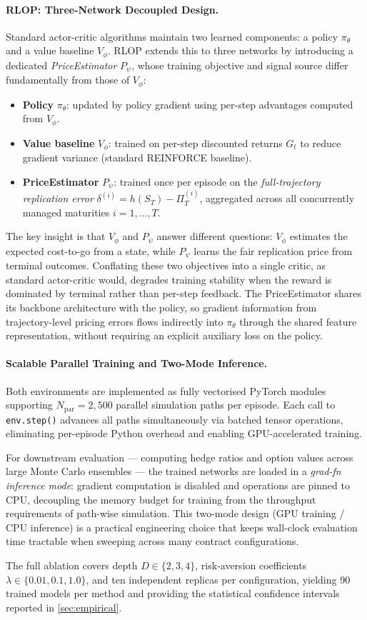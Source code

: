 \paragraph{RLOP: Three-Network Decoupled Design.}
Standard actor-critic algorithms maintain two learned components: a policy
$\pi_\theta$ and a value baseline $V_\phi$.
RLOP extends this to three networks by introducing a dedicated
\emph{PriceEstimator} $P_\psi$, whose training objective and signal
source differ fundamentally from those of $V_\phi$:
\begin{itemize}[leftmargin=1.2em,topsep=1pt,itemsep=0pt]
  \item \textbf{Policy} $\pi_\theta$: updated by policy gradient using
    per-step advantages computed from $V_\phi$.
  \item \textbf{Value baseline} $V_\phi$: trained on per-step discounted
    returns $G_t$ to reduce gradient variance (standard REINFORCE baseline).
  \item \textbf{PriceEstimator} $P_\psi$: trained once per episode on the
    \emph{full-trajectory replication error}
    $\delta^{(i)} = h(S_T) - \Pi_T^{(i)}$, aggregated across all
    concurrently managed maturities $i=1,\dots,T$.
\end{itemize}
The key insight is that $V_\phi$ and $P_\psi$ answer different questions:
$V_\phi$ estimates the expected cost-to-go from a state, while $P_\psi$
learns the fair replication price from terminal outcomes.
Conflating these two objectives into a single critic, as standard
actor-critic would, degrades training stability when the reward is dominated
by terminal rather than per-step feedback.
The PriceEstimator shares its backbone architecture with the policy,
so gradient information from trajectory-level pricing errors flows
indirectly into $\pi_\theta$ through the shared feature representation,
without requiring an explicit auxiliary loss on the policy.

\paragraph{Scalable Parallel Training and Two-Mode Inference.}
Both environments are implemented as fully vectorised PyTorch modules
supporting $N_{\mathrm{par}}=2{,}500$ parallel simulation paths per
episode.
Each call to \texttt{env.step()} advances all paths simultaneously via
batched tensor operations, eliminating per-episode Python overhead and
enabling GPU-accelerated training.

For downstream evaluation --- computing hedge ratios and option values
across large Monte Carlo ensembles --- the trained networks are loaded in a
\emph{grad-fn inference mode}: gradient computation is disabled and
operations are pinned to CPU, decoupling the memory budget for training from
the throughput requirements of path-wise simulation.
This two-mode design (GPU training / CPU inference) is a practical
engineering choice that keeps wall-clock evaluation time tractable when
sweeping across many contract configurations.

The full ablation covers depth $D\in\{2,3,4\}$, risk-aversion coefficients
$\lambda\in\{0.01,0.1,1.0\}$, and ten independent replicas per
configuration, yielding 90 trained models per method and providing
the statistical confidence intervals reported in \cref{sec:empirical}.
